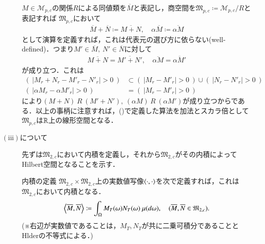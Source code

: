 \begin{description}
			$M \in \mathcal{M}_{p,c}$の関係$R$による同値類を$\overline{M}$と表記し，商空間を$\mathfrak{M}_{p,c} \coloneqq \mathcal{M}_{p,c}/R$と表記すれば
			$\mathfrak{M}_{p,c}$において
			\begin{align}
				\overline{M} + \overline{N} \coloneqq \overline{M+N}, \quad \alpha \overline{M} \coloneqq \overline{\alpha M} \label{eq:mart_linear_arithmetic}
			\end{align}
			として演算を定義すれば，これは代表元の選び方に依らない(well-defined)．つまり$M' \in \overline{M},\ N' \in \overline{N}$に対して
			\begin{align}
				\overline{M+N} = \overline{M'+N'}, \quad \overline{\alpha M} = \overline{\alpha M'}
			\end{align}
			が成り立つ．これは
			\begin{align}
				\left(\ \left|M_r + N_r - M'_r - N'_r \right| > 0\ \right) &\subset \left(\ \left|M_r - M'_r \right| > 0\ \right) \cup \left(\ \left|N_r - N'_r \right| > 0\ \right) \\
				\left(\ \left|\alpha M_r - \alpha M'_r \right| > 0\ \right) &= \left(\ \left|M_r - M'_r \right| > 0\ \right)
			\end{align}
			により$(M+N)\ R\ (M'+N'),\ (\alpha M)\ R\ (\alpha M')$が成り立つからである．以上の事柄に注意すれば，()で定義した算法を加法とスカラ倍として
			$\mathfrak{M}_{p,c}$は$\mathbb{R}$上の線形空間となる．
		
		\item[$\mathrm{(iii)}$について]
			先ずは$\mathfrak{M}_{2,c}$において内積を定義し，それから$\mathfrak{M}_{2,c}$がその内積によってHilbert空間となることを示す．
			\begin{itembox}[l]{内積の定義}
				$\mathfrak{M}_{2,c} \times \mathfrak{M}_{2,c}$上の実数値写像$\inprod<\cdot,\cdot>$を次で定義すれば，これは$\mathfrak{M}_{2,c}$において内積となる．
				\begin{align}
					\inprod<\overline{M},\overline{N}> \coloneqq \int_{\Omega} M_T(\omega)N_T(\omega)\ \mu(d\omega), \quad (\overline{M},\overline{N} \in \mathfrak{M}_{2,c}).
				\end{align}
				(※{\scriptsize 右辺が実数値であることは，$M_T,N_T$が共に二乗可積分であることとHlderの不等式による．})
			\end{itembox}
	

\end{description}

